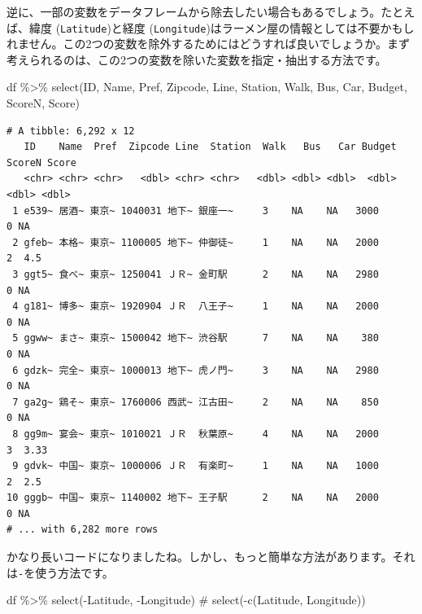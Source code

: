 \documentclass[
  a4paper,
  pandoc,
  ja=standard,
  jafont=haranoaji]{bxjsbook}
\newenvironment{Shaded}{\begin{snugshade}}{\end{snugshade}}
\newcommand{\CommentTok}[1]{\textcolor[rgb]{0.37,0.37,0.37}{#1}}
\newcommand{\FunctionTok}[1]{\textcolor[rgb]{0.28,0.35,0.67}{#1}}
\newcommand{\NormalTok}[1]{\textcolor[rgb]{0.00,0.48,0.65}{#1}}
\newcommand{\SpecialCharTok}[1]{\textcolor[rgb]{0.37,0.37,0.37}{#1}}
\begin{document}
逆に、一部の変数をデータフレームから除去したい場合もあるでしょう。たとえば、緯度
(\texttt{Latitude})と経度
(\texttt{Longitude})はラーメン屋の情報としては不要かもしれません。この2つの変数を除外するためにはどうすれば良いでしょうか。まず考えられるのは、この2つの変数を除いた変数を指定・抽出する方法です。

\begin{Shaded}
\begin{Highlighting}[numbers=left,,]
\NormalTok{df }\SpecialCharTok{\%\textgreater{}\%}
  \FunctionTok{select}\NormalTok{(ID, Name, Pref, Zipcode, }
\NormalTok{         Line, Station, Walk, Bus, Car, Budget, ScoreN, Score)}
\end{Highlighting}
\end{Shaded}

\begin{verbatim}
# A tibble: 6,292 x 12
   ID    Name  Pref  Zipcode Line  Station  Walk   Bus   Car Budget ScoreN Score
   <chr> <chr> <chr>   <dbl> <chr> <chr>   <dbl> <dbl> <dbl>  <dbl>  <dbl> <dbl>
 1 e539~ 居酒~ 東京~ 1040031 地下~ 銀座一~     3    NA    NA   3000      0 NA   
 2 gfeb~ 本格~ 東京~ 1100005 地下~ 仲御徒~     1    NA    NA   2000      2  4.5 
 3 ggt5~ 食べ~ 東京~ 1250041 ＪＲ~ 金町駅      2    NA    NA   2980      0 NA   
 4 g181~ 博多~ 東京~ 1920904 ＪＲ  八王子~     1    NA    NA   2000      0 NA   
 5 ggww~ まさ~ 東京~ 1500042 地下~ 渋谷駅      7    NA    NA    380      0 NA   
 6 gdzk~ 完全~ 東京~ 1000013 地下~ 虎ノ門~     3    NA    NA   2980      0 NA   
 7 ga2g~ 鶏そ~ 東京~ 1760006 西武~ 江古田~     2    NA    NA    850      0 NA   
 8 gg9m~ 宴会~ 東京~ 1010021 ＪＲ  秋葉原~     4    NA    NA   2000      3  3.33
 9 gdvk~ 中国~ 東京~ 1000006 ＪＲ  有楽町~     1    NA    NA   1000      2  2.5 
10 gggb~ 中国~ 東京~ 1140002 地下~ 王子駅      2    NA    NA   2000      0 NA   
# ... with 6,282 more rows
\end{verbatim}

かなり長いコードになりましたね。しかし、もっと簡単な方法があります。それは\texttt{-}を使う方法です。

\begin{Shaded}
\begin{Highlighting}[numbers=left,,]
\NormalTok{df }\SpecialCharTok{\%\textgreater{}\%}
  \FunctionTok{select}\NormalTok{(}\SpecialCharTok{{-}}\NormalTok{Latitude, }\SpecialCharTok{{-}}\NormalTok{Longitude) }\CommentTok{\# select({-}c(Latitude, Longitude))}
\end{Highlighting}
\end{Shaded}
\end{document}
